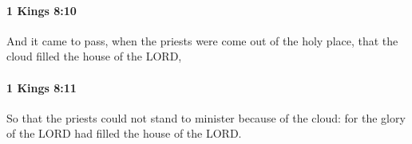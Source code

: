 		\paragraph{1 Kings 8:10} %
			\label{1KINGS-8-10}

			And it came to pass, when the priests were come out of the holy place, that the cloud filled the house of the LORD,


		\paragraph{1 Kings 8:11} %
			\label{1KINGS-8-11}

			So that the priests could not stand to minister because of the cloud: for the glory of the LORD had filled the house of the LORD.



